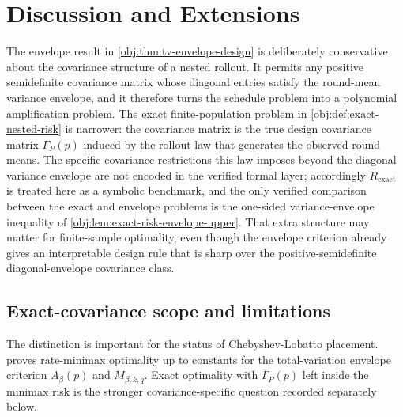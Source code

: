 \section{Discussion and Extensions}

The envelope result in \cref{obj:thm:tv-envelope-design} is deliberately conservative about the covariance structure of a nested rollout. It permits any positive semidefinite covariance matrix whose diagonal entries satisfy the round-mean variance envelope, and it therefore turns the schedule problem into a polynomial amplification problem. The exact finite-population problem in \cref{obj:def:exact-nested-risk} is narrower: the covariance matrix is the true design covariance matrix \(\Gamma_P(p)\) induced by the rollout law that generates the observed round means. The specific covariance restrictions this law imposes beyond the diagonal variance envelope are not encoded in the verified formal layer; accordingly \(R_{\mathrm{exact}}\) is treated here as a symbolic benchmark, and the only verified comparison between the exact and envelope problems is the one-sided variance-envelope inequality of \cref{obj:lem:exact-risk-envelope-upper}. That extra structure may matter for finite-sample optimality, even though the envelope criterion already gives an interpretable design rule that is sharp over the positive-semidefinite diagonal-envelope covariance class.

\subsection{Exact-covariance scope and limitations}

The distinction is important for the status of Chebyshev-Lobatto placement.  proves rate-minimax optimality up to constants for the total-variation envelope criterion \(A_\beta(p)\) and \(M_{\beta,k,q}\). Exact optimality with \(\Gamma_P(p)\) left inside the minimax risk is the stronger covariance-specific question recorded separately below.

